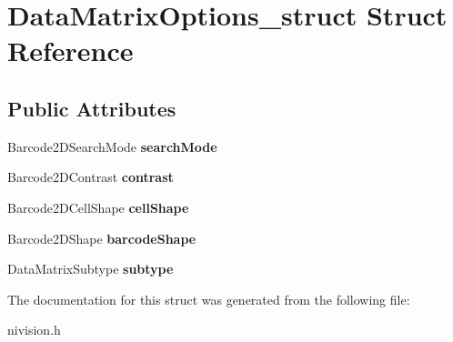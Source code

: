 \hypertarget{structDataMatrixOptions__struct}{
\section{DataMatrixOptions\_\-struct Struct Reference}
\label{structDataMatrixOptions__struct}
}
\subsection*{Public Attributes}
\begin{DoxyCompactItemize}
\item 
\hypertarget{structDataMatrixOptions__struct_a876b0bb1832b6ccb9947c65f9581cdcf}{
Barcode2DSearchMode {\bfseries searchMode}}
\label{structDataMatrixOptions__struct_a876b0bb1832b6ccb9947c65f9581cdcf}

\item 
\hypertarget{structDataMatrixOptions__struct_aa9b7ca3f7c012279a65162df5d052c95}{
Barcode2DContrast {\bfseries contrast}}
\label{structDataMatrixOptions__struct_aa9b7ca3f7c012279a65162df5d052c95}

\item 
\hypertarget{structDataMatrixOptions__struct_af11da0c095a44f46626529e53e35c27c}{
Barcode2DCellShape {\bfseries cellShape}}
\label{structDataMatrixOptions__struct_af11da0c095a44f46626529e53e35c27c}

\item 
\hypertarget{structDataMatrixOptions__struct_ac70f307193d24dbe662ea8e6586d4e3b}{
Barcode2DShape {\bfseries barcodeShape}}
\label{structDataMatrixOptions__struct_ac70f307193d24dbe662ea8e6586d4e3b}

\item 
\hypertarget{structDataMatrixOptions__struct_a48aba1ef2452faaef1725621fa265112}{
DataMatrixSubtype {\bfseries subtype}}
\label{structDataMatrixOptions__struct_a48aba1ef2452faaef1725621fa265112}

\end{DoxyCompactItemize}


The documentation for this struct was generated from the following file:\begin{DoxyCompactItemize}
\item 
nivision.h\end{DoxyCompactItemize}
